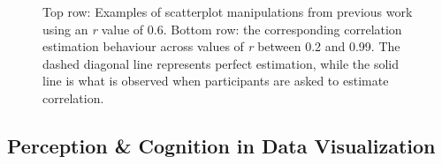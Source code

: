 \documentclass[manuscript,screen,review,anonymous]{acmart}
\providecommand{\DIFaddbeginFL}{} %
\providecommand{\DIFaddendFL}{} %
\providecommand{\DIFdelbeginFL}{} %
\providecommand{\DIFdelendFL}{} %
\newcommand{\DIFscaledelfig}{0.5}
\newlength{\DIFdelgraphicswidth} %
\newlength{\DIFdelgraphicsheight} %
\newcommand{\DIFaddincludegraphics}[2][]{{\color{blue}\fbox{\DIFOincludegraphics[#1]{#2}}}} %
\newcommand{\DIFdelincludegraphics}[2][]{%
\sbox{\DIFdelgraphicsbox}{\DIFOincludegraphics[#1]{#2}}%
\settoboxwidth{\DIFdelgraphicswidth}{\DIFdelgraphicsbox} %
\settoboxtotalheight{\DIFdelgraphicsheight}{\DIFdelgraphicsbox} %
\scalebox{\DIFscaledelfig}{%
\parbox[b]{\DIFdelgraphicswidth}{\usebox{\DIFdelgraphicsbox}\\[-\baselineskip] \rule{\DIFdelgraphicswidth}{0em}}\llap{\resizebox{\DIFdelgraphicswidth}{\DIFdelgraphicsheight}{%
\setlength{\unitlength}{\DIFdelgraphicswidth}%
\begin{picture}(1,1)%
\thicklines\linethickness{2pt} %
{\color[rgb]{1,0,0}\put(0,0){\framebox(1,1){}}}%
{\color[rgb]{1,0,0}\put(0,0){\line( 1,1){1}}}%
{\color[rgb]{1,0,0}\put(0,1){\line(1,-1){1}}}%
\end{picture}%
}\hspace*{3pt}}} %
} %
\DeclareRobustCommand{\DIFaddbeginFL}{\DIFOaddbeginFL \let\includegraphics\DIFaddincludegraphics} %
\DeclareRobustCommand{\DIFaddendFL}{\DIFOaddendFL \let\includegraphics\DIFOincludegraphics} %
\DeclareRobustCommand{\DIFdelbeginFL}{\DIFOdelbeginFL \let\includegraphics\DIFdelincludegraphics} %
\DeclareRobustCommand{\DIFdelendFL}{\DIFOaddendFL \let\includegraphics\DIFOincludegraphics} %
\begin{document}
\begin{figure}

\DIFdelbeginFL %


\DIFdelendFL \DIFaddbeginFL {}
\DIFaddendFL 

\caption{\label{fig-previous-manipulations}Top row: Examples of
scatterplot manipulations from previous work using an \textit{r} value
of 0.6. Bottom row: the corresponding correlation estimation behaviour
across values of \textit{r} between 0.2 and 0.99. The dashed diagonal
line represents perfect estimation, while the solid line is what is
observed when participants are asked to estimate correlation.}

\end{figure}%

\subsection{Perception \& Cognition in Data
Visualization}\label{sec-perception-cognition}
\end{document}
